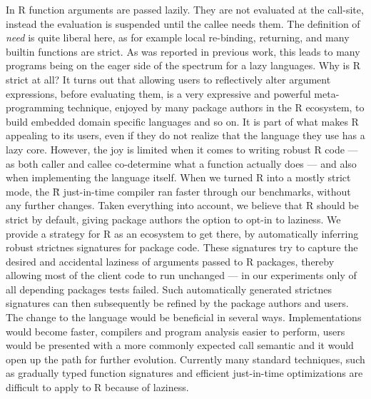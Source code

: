 \documentclass[review,nonacm,screen,acmsmall,anonymous=true]{acmart}
\renewcommand{\Rsh}{{\sf\u R}\xspace}
\begin{document}
In R function arguments are passed lazily. They are not evaluated at the
call-site, instead the evaluation is suspended until the callee needs them. The
definition of \emph{need} is quite liberal here, as for example local
re-binding, returning, and many builtin functions are strict. As was reported in
previous work, this leads to many programs being on the eager side of the
spectrum for a lazy languages. Why is R strict at all? It turns out that
allowing users to reflectively alter argument expressions, before evaluating
them, is a very expressive and powerful meta-programming technique, enjoyed by
many package authors in the R ecosystem, to build embedded domain specific languages
and so on. It is part of what makes R appealing to its users, even
if they do not realize that the language they use has a lazy core. However,
the joy is limited when it comes to writing robust R code --- as both caller and
callee co-determine what a function actually does --- and also when implementing
the language itself. When we turned R into a mostly strict mode, the \Rsh just-in-time
compiler ran \speedupRshStrict faster through our benchmarks, without any
further changes. Taken everything into account, we believe that R should be
strict by default, giving package authors the option to opt-in to laziness. We
provide a strategy for R as an ecosystem to get there, by automatically inferring
robust strictnes signatures for package code. These signatures try to capture
the desired and accidental laziness of arguments passed to R packages, thereby
allowing most of the client code to run unchanged --- in our experiments only
\robustnesResult of all depending packages tests failed. Such automatically
generated strictnes signatures can then subsequently be refined by the package authors and
users. The change to the language would be beneficial in several ways.
Implementations would become faster, compilers and program analysis easier to
perform, users would be presented with a more commonly expected call semantic
and it would open up the path for further evolution. Currently many standard
techniques, such as gradually typed function signatures and efficient just-in-time
optimizations are difficult to apply to R because of laziness.



\end{document}
